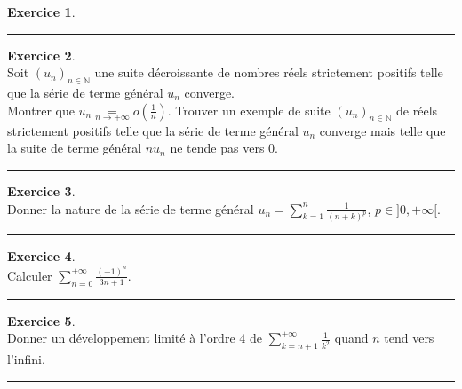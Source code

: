 \documentclass[a4paper,10pt]{article}
\theoremstyle{definition}
\theoremstyle{definition}
\newtheorem{exo}{Exercice}
\newcommand{\N}{\mathbb{N}}
\begin{document}
\begin{minipage}{1\linewidth}
\begin{minipage}[t]{0.48\linewidth}
\begin{exo}
			\centering
			\rule{1\linewidth}{0.6pt}
		\end{exo}
		
		
		
	\end{minipage}	
	\hfill\vrule\hfill
	\begin{minipage}[t]{0.48\linewidth}
		\raggedright
		
		
		\begin{exo}\quad\\[0.25cm]
			Soit $(u_n)_{n\in\N}$ une suite décroissante de nombres réels strictement positifs telle que la série de terme général $u_n$ converge.\\[0.2cm] Montrer que $u_n\underset{n\rightarrow+\infty}{=}o\left(\frac{1}{n}\right)$. Trouver un exemple de suite $(u_n)_{n\in\N}$ de réels strictement positifs telle que la série de terme général $u_n$ converge mais telle que la suite de terme général $nu_n$ ne tende pas vers $0$.
			
			\centering
			\rule{1\linewidth}{0.6pt}
		\end{exo}	
		
		\begin{exo}\quad\\[0.25cm]
			Donner la nature de la série de terme général $u_n=\sum_{k=1}^{n}\frac{1}{(n+k)^p}$, $p\in]0,+\infty[$.
			
			\centering
			\rule{1\linewidth}{0.6pt}
		\end{exo}
	
	
		\begin{exo}\quad\\[0.25cm]
		 Calculer $\sum_{n=0}^{+\infty}\frac{(-1)^n}{3n+1}$.
		
		\centering
		\rule{1\linewidth}{0.6pt}
		\end{exo}
	
	\begin{exo}\quad\\[0.25cm]
		Donner un développement limité à l'ordre $4$ de $\sum_{k=n+1}^{+\infty}\frac{1}{k^2}$ quand $n$ tend vers l'infini.
		
		\centering
		\rule{1\linewidth}{0.6pt}
	\end{exo}	
		
		
	\end{minipage}
\end{minipage}	
\end{document}
